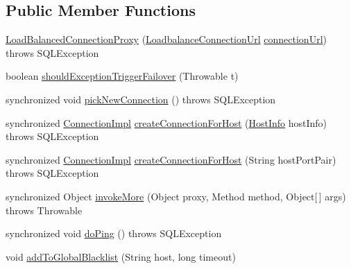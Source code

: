 \subsection*{Public Member Functions}
\begin{DoxyCompactItemize}
\item 
\mbox{\hyperlink{classcom_1_1mysql_1_1cj_1_1jdbc_1_1ha_1_1_load_balanced_connection_proxy_a236928d6a49c1bbc3dfd6e4615a34f0d}{Load\+Balanced\+Connection\+Proxy}} (\mbox{\hyperlink{classcom_1_1mysql_1_1cj_1_1conf_1_1url_1_1_loadbalance_connection_url}{Loadbalance\+Connection\+Url}} \mbox{\hyperlink{classcom_1_1mysql_1_1cj_1_1jdbc_1_1ha_1_1_multi_host_connection_proxy_aae3d1ff31056ba5a6686ce6e692a64a8}{connection\+Url}})  throws S\+Q\+L\+Exception 
\item 
boolean \mbox{\hyperlink{classcom_1_1mysql_1_1cj_1_1jdbc_1_1ha_1_1_load_balanced_connection_proxy_a89ff36a24aa0df79fb9363ef5c6e5be2}{should\+Exception\+Trigger\+Failover}} (Throwable t)
\item 
synchronized void \mbox{\hyperlink{classcom_1_1mysql_1_1cj_1_1jdbc_1_1ha_1_1_load_balanced_connection_proxy_a3a91f1004880ec0566519ad4af6e3c34}{pick\+New\+Connection}} ()  throws S\+Q\+L\+Exception 
\item 
synchronized \mbox{\hyperlink{classcom_1_1mysql_1_1cj_1_1jdbc_1_1_connection_impl}{Connection\+Impl}} \mbox{\hyperlink{classcom_1_1mysql_1_1cj_1_1jdbc_1_1ha_1_1_load_balanced_connection_proxy_ad26b7e7a242eeab7a90983f6e5095779}{create\+Connection\+For\+Host}} (\mbox{\hyperlink{classcom_1_1mysql_1_1cj_1_1conf_1_1_host_info}{Host\+Info}} host\+Info)  throws S\+Q\+L\+Exception 
\item 
synchronized \mbox{\hyperlink{classcom_1_1mysql_1_1cj_1_1jdbc_1_1_connection_impl}{Connection\+Impl}} \mbox{\hyperlink{classcom_1_1mysql_1_1cj_1_1jdbc_1_1ha_1_1_load_balanced_connection_proxy_a27662d65e82acb86f3cc6af3f4f331ee}{create\+Connection\+For\+Host}} (String host\+Port\+Pair)  throws S\+Q\+L\+Exception 
\item 
synchronized Object \mbox{\hyperlink{classcom_1_1mysql_1_1cj_1_1jdbc_1_1ha_1_1_load_balanced_connection_proxy_a77ff10a73000704f3d23fbe59510bab4}{invoke\+More}} (Object proxy, Method method, Object\mbox{[}$\,$\mbox{]} args)  throws Throwable 
\item 
synchronized void \mbox{\hyperlink{classcom_1_1mysql_1_1cj_1_1jdbc_1_1ha_1_1_load_balanced_connection_proxy_a735361812f6c57f687ad6512e4bd3809}{do\+Ping}} ()  throws S\+Q\+L\+Exception 
\item 
void \mbox{\hyperlink{classcom_1_1mysql_1_1cj_1_1jdbc_1_1ha_1_1_load_balanced_connection_proxy_aa51cafef5f72668308cba5c93c1ec2be}{add\+To\+Global\+Blacklist}} (String host, long timeout)

\end{DoxyCompactItemize}
